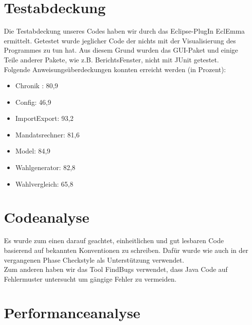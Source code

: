 \documentclass[12pt,a4paper,titlepage]{article}
\begin{document}
\section{Testabdeckung}
Die Testabdeckung unseres Codes haben wir durch das Eclipse-PlugIn EclEmma ermittelt. Getestet wurde jeglicher Code der nichts mit der Visualisierung des Programmes zu tun hat. Aus diesem Grund wurden das GUI-Paket und einige Teile anderer Pakete, wie z.B. BerichtsFenster, nicht mit JUnit getestet.\\
Folgende Anweisungsüberdeckungen konnten erreicht werden (in Prozent):\\
\begin{itemize}
\item{Chronik} : 80,9 

\item{Config}: 46,9 

\item{ImportExport}: 93,2

\item{Mandatsrechner}: 81,6 

\item{Model}: 84,9 

\item{Wahlgenerator}: 82,8 

\item{Wahlvergleich}: 65,8 

\end{itemize}

\section{Codeanalyse}
Es wurde zum einen darauf geachtet, einheitlichen und gut lesbaren Code basierend auf bekannten Konventionen zu schreiben. Dafür wurde wie auch in der vergangenen Phase Checkstyle als Unterstützung verwendet.\\

Zum anderen haben wir das Tool FindBugs verwendet, dass Java Code auf Fehlermuster untersucht um gängige Fehler zu vermeiden.\\

\section{Performanceanalyse}
\end{document}
